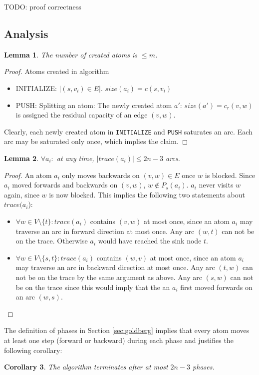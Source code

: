 \documentclass[a4paper,10pt, twocolumn]{article}
\newtheorem{lemma}{Lemma}
\newtheorem{corollary}[lemma]{Corollary}
\begin{document}
TODO: proof correctness


\subsection{Analysis}
\label{sec:gt_analysis}
\begin{lemma}
The number of created atoms is $\leq m$.
\end{lemma}
\begin{proof}
Atoms created in algorithm
\begin{itemize}
	\item INITIALIZE: $\lvert (s,v_i) \in E \rvert$. $size(a_i) = c(s,v_i)$
	\item PUSH: Splitting an atom: The newly created atom $a'$: $size(a') = c_r(v,w)$ is assigned the residual capacity of an edge $(v,w)$.
\end{itemize}
Clearly, each newly created atom in \lstinline|INITIALIZE| and \lstinline|PUSH| saturates an arc. Each arc may be saturated only once, which implies the claim.
\end{proof}

\begin{lemma}
$\forall a_i:$ at any time, $\lvert trace(a_i) \rvert \leq 2n-3$ arcs.
\end{lemma}
\begin{proof}
An atom $a_i$ only moves backwards on $(v,w) \in E$ once $w$ is blocked. Since $a_i$ moved forwards and backwards on $(v,w)$, $w \notin P_s(a_i)$. $a_i$ never visits $w$ again, since $w$ is now blocked. This implies the following two statements about $trace(a_i$):
\begin{itemize}
	\item $\forall w \in V \setminus \{t\}: trace(a_i)$ contains $(v,w)$ at most once, since an atom $a_i$ may traverse an arc in forward direction at most once. Any arc $(w,t)$ can not be on the trace. Otherwise $a_i$ would have reached the sink node $t$.
	\item $\forall w \in V \setminus \{s,t\}: trace(a_i)$ contains $(w,v)$ at most once, since an atom $a_i$ may traverse an arc in backward direction at most once. Any arc $(t,w)$ can not be on the trace by the same argument as above.  Any arc $(s,w)$ can not be on the trace since this would imply that the an $a_i$ first moved forwards on an arc $(w,s)$.
\end{itemize}
\end{proof}


The definition of phases in Section \ref{sec:goldberg} implies that every atom moves at least one step (forward or backward) during each phase and justifies the following corollary:
\begin{corollary}
The algorithm terminates after at most $2n-3$ phases.
\end{corollary}
\end{document}
